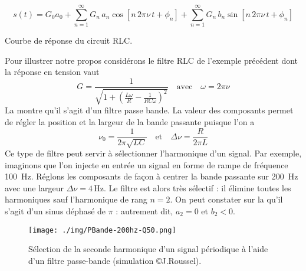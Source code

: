 \[
s(t)=G_0a_0+\sum_{n=1}^\infty G_n\,a_n\cos\left[n\,2\pi\nu\, t+\phi_n\right]+
\sum_{n=1}^\infty G_n\,b_n\sin\left[n\,2\pi\nu\, t+\phi_n\right]
\]
\begin{marginfigure}
	\centering
	\caption{Courbe de réponse du circuit RLC.}
\end{marginfigure}
Pour illustrer notre propos considérons le filtre RLC de l'exemple précédent dont la réponse en tension vaut 
\[
	G=\frac{1}{\sqrt{1+\left(\frac{L\omega}{R}-\frac{1}{RC\omega}\right)^2}}
	\quad\text{avec}\quad\omega=2\pi \nu
\]
La  montre qu'il s'agit d'un filtre passe bande. La valeur des composants permet de régler la position et la largeur de la bande passante puisque l'on  a 
\[
\nu_0=\frac{1}{2\pi\sqrt{LC}}\quad\text{et}\quad \Delta \nu=\frac{R}{2\pi L}
\]
Ce type de filtre peut servir à sélectionner l'harmonique d'un signal. Par exemple, imaginons que l'on injecte en entrée un signal en forme de rampe de fréquence 100~Hz. Réglons les composants de façon à centrer la bande passante sur 200~Hz avec une largeur \(\Delta \nu=4\,\mathrm{Hz}\). Le filtre est alors très sélectif : il élimine toutes les harmoniques sauf l'harmonique de rang \(n=2\). On peut constater sur la  qu'il s'agit d'un sinus déphasé de \(\pi\) : autrement dit, \(a_2=0\) et \(b_2<0\).

\begin{figure*}[htbp]
	\centering
 	\texttt{[image: ./img/PBande-200hz-Q50.png]}
 	\caption[Sélection de la seconde harmonique d'un signal périodique]{Sélection de la seconde harmonique d'un signal périodique à l'aide d'un filtre passe-bande (simulation \copyright J.Roussel).}
\end{figure*}

